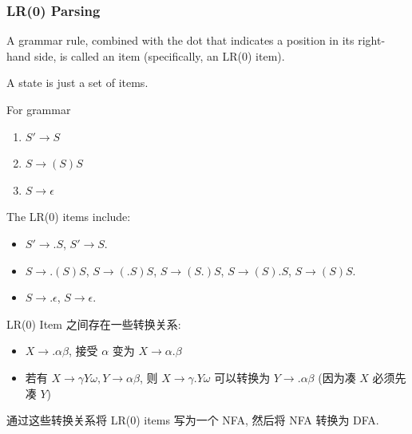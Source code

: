     



\subsubsection{LR(0) Parsing}
\begin{definition}[LR(0) item]
    A grammar rule, combined with the dot that indicates a position in its right-hand side, is called an item (specifically, an LR(0) item).
\end{definition}

A state is just a set of items.

\begin{example}\label{exp:lr0}
    For grammar
    \begin{enumerate}
        \item $S'\to S$
        \item $S\to (S)S$
        \item $S\to \epsilon$
    \end{enumerate}
    The LR(0) items include:
    \begin{itemize}
        \item $S'\to .S$, $S'\to S.$
        \item $S\to .(S)S$, $S\to (.S)S$, $S\to (S.)S$, $S\to (S).S$, $S\to (S)S.$
        \item $S\to .\epsilon$, $S\to \epsilon.$
    \end{itemize}
\end{example}

LR(0) Item  之间存在一些转换关系:
\begin{itemize}
    \item $X\to .\alpha\beta$, 接受 $\alpha$ 变为 $X\to \alpha . \beta$
    \item 若有 $X\to \gamma Y\omega, Y\to \alpha\beta$, 则 $X\to \gamma . Y \omega$ 可以转换为 $Y\to .\alpha \beta$ (因为凑 $X$ 必须先凑 $Y$)
\end{itemize}
通过这些转换关系将 LR(0) items 写为一个 NFA, 然后将 NFA 转换为 DFA. 

